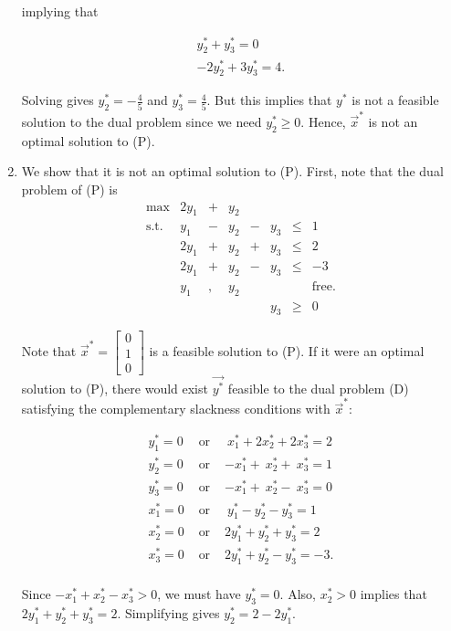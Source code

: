 \begin{enumerate}
  implying that

  \begin{eqnarray*}
   y_2^* + y_3^* = 0~ \\ 
  - 2y_2^* + 3y_3^* = 4.
  \end{eqnarray*}

  Solving gives \(y_2^* = -\frac{4}{5}\) and \(y_3^* = \frac{4}{5}\).
  But this implies that \(y^*\) is not a feasible solution to the dual
  problem since we need \(y_2^* \geq 0\). Hence, \(\vec{x}^*\) is not an
  optimal solution to (P).
\item
  We show that it is not an optimal solution to (P). First, note that
  the dual problem of (P) is \[\begin{array}{rrcrcrlll}
  \max & 2y_1 & +& y_2  &   &       \\
  \mbox{s.t.} 
  &  y_1 & - &  y_2 & - &  y_3 & \leq & 1  \\
  & 2 y_1 & + & y_2 & + & y_3  & \leq & 2  \\
  & 2 y_1 & + & y_2 & - & y_3  & \leq & -3  \\
  &  y_1 & , & y_2  &   &      &  & \mbox{free.} \\
  &      &   &      &   & y_3  & \geq  & 0
  \end{array}\]

  Note that \(\vec{x}^* = \begin{bmatrix} 0 \\ 1 \\ 0 \end{bmatrix}\) is
  a feasible solution to (P). If it were an optimal solution to (P),
  there would exist \(\vec{y^*}\) feasible to the dual problem (D)
  satisfying the complementary slackness conditions with \(\vec{x}^*\):

  \begin{eqnarray*}
   y_1^* = 0 & \mbox{ or } &  ~x_1^* + 2x_2^* + 2x_3^* = 2 \\
   y_2^* = 0 & \mbox{ or } &  -x_1^* + ~x_2^* + ~x_3^* = 1 \\
   y_3^* = 0 & \mbox{ or } &  -x_1^* + ~x_2^* - ~x_3^* = 0 \\
   x_1^* = 0 & \mbox{ or } &  ~y_1^* - y_2^* - y_3^* = 1 \\
   x_2^* = 0 & \mbox{ or } &  2y_1^*  + y_2^* + y_3^* =  2 \\
   x_3^* = 0 & \mbox{ or } &  2y_1^*  + y_2^* - y_3^* = -3. \\
  \end{eqnarray*}

  Since \(-x^*_1 + x_2^* - x_3^* \gt 0\), we must have \(y_3^* = 0\).
  Also, \(x_2^* \gt 0\) implies that \(2y_1^* + y_2^* + y_3^* = 2\).
  Simplifying gives \(y_2^* = 2 -2y_1^*\).


\end{enumerate}
